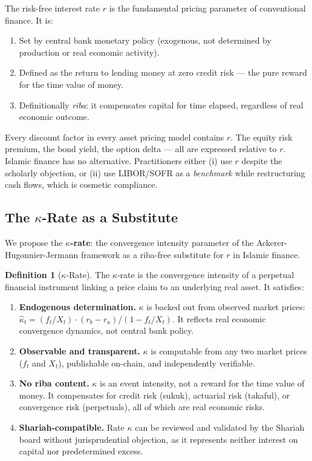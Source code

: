 \documentclass[10pt,twocolumn]{article}
\theoremstyle{plain}
\theoremstyle{definition}
\newtheorem{definition}{Definition}
\begin{document}
The risk-free interest rate $r$ is the fundamental pricing
parameter of conventional finance. It is:
\begin{enumerate}[leftmargin=*,noitemsep]
\item Set by central bank monetary policy (exogenous, not
determined by production or real economic activity).
\item Defined as the return to lending money at zero credit risk
--- the pure reward for the time value of money.
\item Definitionally \textit{riba}: it compensates capital for
time elapsed, regardless of real economic outcome.
\end{enumerate}
Every discount factor in every asset pricing model contains $r$.
The equity risk premium, the bond yield, the option delta ---
all are expressed relative to $r$. Islamic finance has no
alternative. Practitioners either (i) use $r$ despite the
scholarly objection, or (ii) use LIBOR/SOFR as a \textit{benchmark}
while restructuring cash flows, which is cosmetic compliance.

\subsection{The $\kappa$-Rate as a Substitute}

We propose the \textbf{$\kappa$-rate}: the convergence intensity
parameter of the Ackerer-Hugonnier-Jermann framework as a
riba-free substitute for $r$ in Islamic finance.

\begin{definition}[$\kappa$-Rate]
The $\kappa$-rate is the convergence intensity of a perpetual
financial instrument linking a price claim to an underlying
real asset. It satisfies:
\begin{enumerate}[leftmargin=*,noitemsep]
\item \textbf{Endogenous determination.} $\kappa$ is backed out
from observed market prices:
$\hat\kappa_t = (f_t/X_t)\cdot(r_b-r_a)/(1-f_t/X_t)$.
It reflects real economic convergence dynamics, not central
bank policy.
\item \textbf{Observable and transparent.} $\kappa$ is computable
from any two market prices ($f_t$ and $X_t$), publishable
on-chain, and independently verifiable.
\item \textbf{No riba content.} $\kappa$ is an event intensity,
not a reward for the time value of money. It compensates for
credit risk (sukuk), actuarial risk (takaful), or convergence
risk (perpetuals), all of which are real economic risks.
\item \textbf{Shariah-compatible.} Rate $\kappa$ can be reviewed
and validated by the Shariah board without jurisprudential
objection, as it represents neither interest on capital nor
predetermined excess.
\end{enumerate}
\end{definition}
\end{document}
